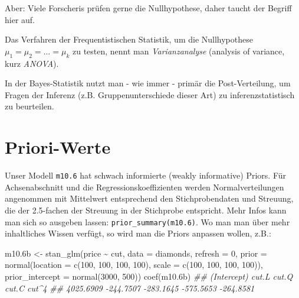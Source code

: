 \documentclass[
  a4paper,
  DIV=11]{scrreprt}
\newenvironment{Shaded}{\begin{snugshade}}{\end{snugshade}}
\newcommand{\AttributeTok}[1]{\textcolor[rgb]{0.40,0.45,0.13}{#1}}
\newcommand{\DecValTok}[1]{\textcolor[rgb]{0.68,0.00,0.00}{#1}}
\newcommand{\DocumentationTok}[1]{\textcolor[rgb]{0.37,0.37,0.37}{\textit{#1}}}
\newcommand{\FloatTok}[1]{\textcolor[rgb]{0.68,0.00,0.00}{#1}}
\newcommand{\FunctionTok}[1]{\textcolor[rgb]{0.28,0.35,0.67}{#1}}
\newcommand{\NormalTok}[1]{\textcolor[rgb]{0.00,0.23,0.31}{#1}}
\newcommand{\OtherTok}[1]{\textcolor[rgb]{0.00,0.23,0.31}{#1}}
\newcommand{\SpecialCharTok}[1]{\textcolor[rgb]{0.37,0.37,0.37}{#1}}
\theoremstyle{definition}
\theoremstyle{remark}
\begin{document}
Aber: Viele Forscheris prüfen gerne die Nullhypothese, daher taucht der
Begriff hier auf.

Das Verfahren der Frequentistischen Statistik, um die Nullhypothese
\(\mu_1 = \mu_2 = \ldots = \mu_k\) zu testen, nennt man
\emph{Varianzanalyse} (analysis of variance, kurz \emph{ANOVA}).

In der Bayes-Statistik nutzt man - wie immer - primär die
Post-Verteilung, um Fragen der Inferenz (z.B. Gruppenunterschiede dieser
Art) zu inferenzstatistisch zu beurteilen.

\hypertarget{priori-werte}{%
\section{Priori-Werte}\label{priori-werte}}

Unser Modell \texttt{m10.6} hat schwach informierte (weakly informative)
Priors. Für Achsenabschnitt und die Regressionskoeffizienten werden
Normalverteilungen angenommen mit Mittelwert entsprechend den
Stichprobendaten und Streuung, die der 2.5-fachen der Streuung in der
Stichprobe entspricht. Mehr Infos kann man sich so ausgeben lassen:
\texttt{prior\_summary(m10.6)}. Wo man man über mehr inhaltliches Wissen
verfügt, so wird man die Priors anpassen wollen, z.B.:

\begin{Shaded}
\begin{Highlighting}[]
\NormalTok{m10}\FloatTok{.6}\NormalTok{b }\OtherTok{\textless{}{-}} \FunctionTok{stan\_glm}\NormalTok{(price }\SpecialCharTok{\textasciitilde{}}\NormalTok{ cut, }\AttributeTok{data =}\NormalTok{ diamonds, }\AttributeTok{refresh =} \DecValTok{0}\NormalTok{,}
                   \AttributeTok{prior =} \FunctionTok{normal}\NormalTok{(}\AttributeTok{location =} \FunctionTok{c}\NormalTok{(}\DecValTok{100}\NormalTok{, }\DecValTok{100}\NormalTok{, }\DecValTok{100}\NormalTok{, }\DecValTok{100}\NormalTok{),}
                                  \AttributeTok{scale =} \FunctionTok{c}\NormalTok{(}\DecValTok{100}\NormalTok{, }\DecValTok{100}\NormalTok{, }\DecValTok{100}\NormalTok{, }\DecValTok{100}\NormalTok{)),}
                   \AttributeTok{prior\_intercept =} \FunctionTok{normal}\NormalTok{(}\DecValTok{3000}\NormalTok{, }\DecValTok{500}\NormalTok{))}
\FunctionTok{coef}\NormalTok{(m10}\FloatTok{.6}\NormalTok{b)}
\DocumentationTok{\#\# (Intercept)       cut.L       cut.Q       cut.C       cut\^{}4 }
\DocumentationTok{\#\#   4025.6909   {-}244.7507   {-}283.1645   {-}575.5653   {-}264.8581}
\end{Highlighting}
\end{Shaded}
\end{document}

